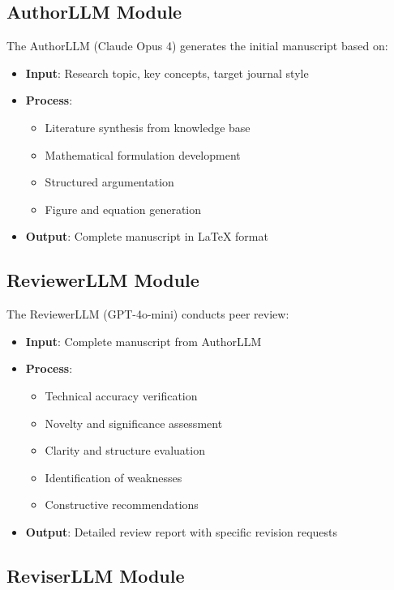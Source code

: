 \documentclass[11pt,a4paper]{article}
\begin{document}
\subsection{AuthorLLM Module}

The AuthorLLM (Claude Opus 4) generates the initial manuscript based on:

\begin{itemize}
    \item \textbf{Input}: Research topic, key concepts, target journal style
    \item \textbf{Process}: 
    \begin{itemize}
        \item Literature synthesis from knowledge base
        \item Mathematical formulation development
        \item Structured argumentation
        \item Figure and equation generation
    \end{itemize}
    \item \textbf{Output}: Complete manuscript in LaTeX format
\end{itemize}

\subsection{ReviewerLLM Module}

The ReviewerLLM (GPT-4o-mini) conducts peer review:

\begin{itemize}
    \item \textbf{Input}: Complete manuscript from AuthorLLM
    \item \textbf{Process}:
    \begin{itemize}
        \item Technical accuracy verification
        \item Novelty and significance assessment
        \item Clarity and structure evaluation
        \item Identification of weaknesses
        \item Constructive recommendations
    \end{itemize}
    \item \textbf{Output}: Detailed review report with specific revision requests
\end{itemize}

\subsection{ReviserLLM Module}
\end{document}

